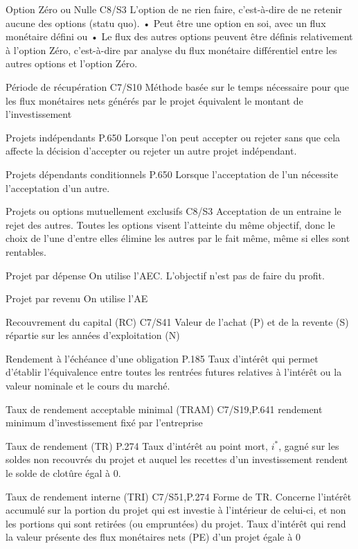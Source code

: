 {\entry
{Option Zéro ou Nulle}
{C8/S3}
{L'option de ne rien faire, c'est-à-dire de ne retenir aucune des options (statu quo). • Peut être une option en soi, avec un flux monétaire défini ou • Le flux des autres options peuvent être définis relativement à l'option Zéro, c’est-à-dire par analyse du flux monétaire différentiel entre les autres options et l’option Zéro.}

\entry
{Période de récupération}
{C7/S10}
{Méthode basée sur le temps nécessaire pour que les flux monétaires nets générés par le projet équivalent le montant de l’investissement}

\entry
{Projets indépendants}
{P.650}
{Lorsque l'on peut accepter ou rejeter sans que cela affecte la décision d'accepter ou rejeter un autre projet indépendant.}

\entry
{Projets dépendants conditionnels}
{P.650}
{Lorsque l'acceptation de l'un nécessite l'acceptation d'un autre.}

\entry
{Projets ou options mutuellement exclusifs}
{C8/S3}
{Acceptation de un entraine le rejet des autres. Toutes les options visent l'atteinte du même objectif, donc le choix de l'une d'entre elles élimine les autres par le fait même, même si elles sont rentables.}

\entry
{Projet par dépense}
{}
{On utilise l'AEC. L'objectif n'est pas de faire du profit.}

\entry
{Projet par revenu}
{}
{On utilise l'AE}

\entry
{Recouvrement du capital (RC)}
{C7/S41}
{Valeur de l’achat (P) et de la revente (S) répartie sur les années d’exploitation (N)}

\entry
{Rendement à l'échéance d'une obligation}
{P.185}
{Taux d'intérêt qui permet d'établir l'équivalence entre toutes les rentrées futures relatives à l'intérêt ou la valeur nominale et le cours du marché.}

\entry
{Taux de rendement acceptable minimal (TRAM)}
{C7/S19,P.641}
{rendement minimum d’investissement fixé par l’entreprise}

\entry
{Taux de rendement (TR)}
{P.274}
{Taux d’intérêt au point mort, $i^*$, gagné sur les soldes non recouvrés du projet et auquel les recettes d'un investissement rendent le solde de clotûre égal à 0.}

\entry
{Taux de rendement interne (TRI)}
{C7/S51,P.274}
{Forme de TR. Concerne l'intérêt accumulé sur la portion du projet qui est investie à l'intérieur de celui-ci, et non les portions qui sont retirées (ou empruntées) du projet. Taux d’intérêt qui rend la valeur présente des flux monétaires nets (PE) d’un projet égale à 0}

}
